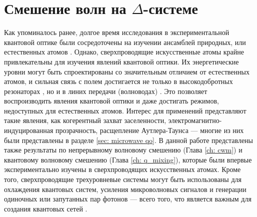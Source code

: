 \chapter{Смешение волн на $\Delta$-системе}
Как упоминалось ранее, долгое время исследования в экспериментальной квантовой оптике были сосредоточены на изучении ансамблей природных, или естественных атомов \cite{Miller_2005,Walther_2006}. Однако, сверхпроводящие искусственные атомы крайне привлекательны для изучения явлений квантовой оптики. Их энергетические уровни могут быть спроектированы со значительным отличием от естественных атомов, и сильная связь с полем достигается не только в высокодобротных резонаторах \cite{wallraff2004strong}, но и в линих передачи (волноводах) \cite{Astafiev2010resonance, vanLoo1494}. Это позволяет воспроизводить явления квантовой оптики и даже достигать режимов, недоступных для естественных атомов. Интерес для применений представляют такие явления, как когерентный захват заселенности, электромагнитно-индуцированная прозрачность, расщепление Аутлера-Таунса --- многие из них были представлены в разделе \ref{sec: microwave qo}. В данной работе представлены также результаты по непрерывному волновому смешению (Глава \ref{ch: cwm}) и квантовому волновому смешению (Глава \ref{ch: q_mixing}), которые были впервые экспериментально изучены в сверхпроводящих искусственных атомах. Кроме того, сверхпроводящие трехуровневые системы могут быть использованы для охлаждения квантовых систем, усиления микроволновых сигналов и генерации одиночных или запутанных пар фотонов --- всего того, что является важным для создания квантовых сетей \cite{kimble2008quantum}.

